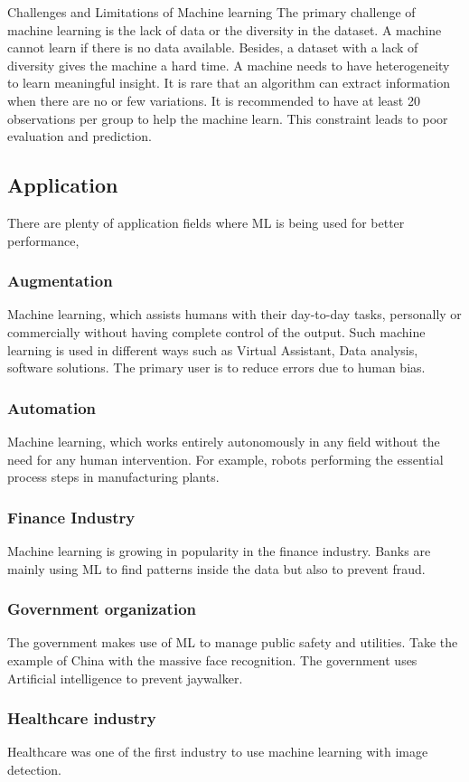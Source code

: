 Challenges and Limitations of Machine learning
The primary challenge of machine learning is the lack of data or the diversity in the dataset. A machine cannot learn if there is no data available. Besides, a dataset with a lack of diversity gives the machine a hard time. A machine needs to have heterogeneity to learn meaningful insight. It is rare that an algorithm can extract information when there are no or few variations. It is recommended to have at least 20 observations per group to help the machine learn. This constraint leads to poor evaluation and prediction.

\subsection{Application}
There are plenty of application fields where ML is being used for better performance,
\subsubsection{Augmentation}
Machine learning, which assists humans with their day-to-day tasks, personally or commercially without having complete control of the output. Such machine learning is used in different ways such as Virtual Assistant, Data analysis, software solutions. The primary user is to reduce errors due to human bias.
\subsubsection{Automation}
Machine learning, which works entirely autonomously in any field without the need for any human intervention. For example, robots performing the essential process steps in manufacturing plants.
\subsubsection{Finance Industry}
Machine learning is growing in popularity in the finance industry. Banks are mainly using ML to find patterns inside the data but also to prevent fraud.
\subsubsection{Government organization}
The government makes use of ML to manage public safety and utilities. Take the example of China with the massive face recognition. The government uses Artificial intelligence to prevent jaywalker.
\subsubsection{Healthcare industry}
Healthcare was one of the first industry to use machine learning with image detection.
